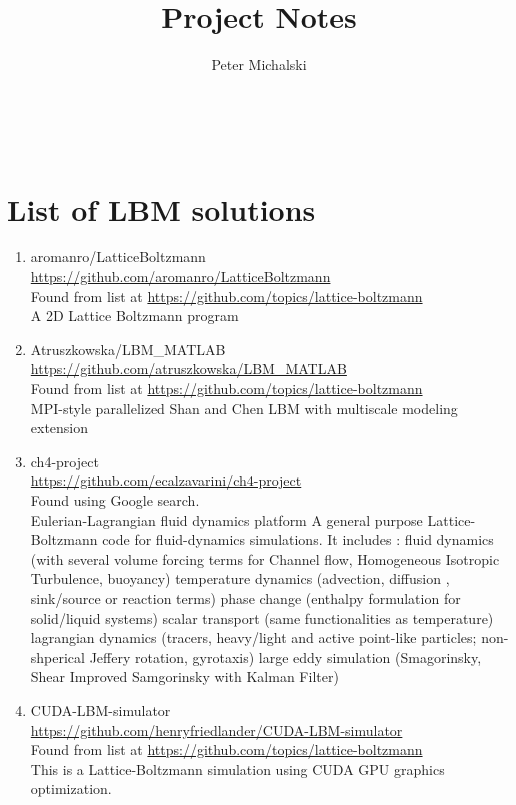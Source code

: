 \documentclass{article}
\title{Project Notes}
\author{Peter Michalski}
\date{}
\begin{document}
\maketitle

~\newpage


\section{List of LBM solutions}
\begin{enumerate}
	\item aromanro/LatticeBoltzmann\\
	\href{https://github.com/aromanro/LatticeBoltzmann}{https://github.com/aromanro/LatticeBoltzmann}\\
	Found from list at \href{https://github.com/topics/lattice-boltzmann}{https://github.com/topics/lattice-boltzmann}\\
	A 2D Lattice Boltzmann program
	
	\item Atruszkowska/LBM\_MATLAB\\
	\href{https://github.com/atruszkowska/LBM_MATLAB}{https://github.com/atruszkowska/LBM\_MATLAB}\\
		Found from list at \href{https://github.com/topics/lattice-boltzmann}{https://github.com/topics/lattice-boltzmann}\\
	MPI-style parallelized Shan and Chen LBM with multiscale modeling extension
	
	\item ch4-project\\
	\href{https://github.com/ecalzavarini/ch4-project}{https://github.com/ecalzavarini/ch4-project}\\  
	Found using Google search.\\
	Eulerian-Lagrangian fluid dynamics platform
	A general purpose Lattice-Boltzmann code for fluid-dynamics simulations. It includes :
	fluid dynamics (with several volume forcing terms for Channel flow, Homogeneous Isotropic Turbulence, buoyancy)
	temperature dynamics (advection, diffusion , sink/source or reaction terms)
	phase change (enthalpy formulation for solid/liquid systems)
	scalar transport (same functionalities as temperature)
	lagrangian dynamics (tracers, heavy/light and active point-like particles; non-shperical Jeffery rotation, gyrotaxis)
	large eddy simulation (Smagorinsky, Shear Improved Samgorinsky with Kalman Filter)
	
	\item CUDA-LBM-simulator\\
	\href{https://github.com/henryfriedlander/CUDA-LBM-simulator}{https://github.com/henryfriedlander/CUDA-LBM-simulator}\\
		Found from list at \href{https://github.com/topics/lattice-boltzmann}{https://github.com/topics/lattice-boltzmann}\\
	This is a Lattice-Boltzmann simulation using CUDA GPU graphics optimization.
	

\end{enumerate}
\end{document}
